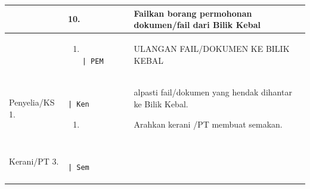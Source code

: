 \documentclass[
]{article}
\begin{document}
\begin{longtable}[]{@{}lll@{}}
\toprule
\begin{minipage}[b]{0.30\columnwidth}\raggedright
\strut
\end{minipage} & \begin{minipage}[b]{0.30\columnwidth}\raggedright
10.\strut
\end{minipage} & \begin{minipage}[b]{0.30\columnwidth}\raggedright
Failkan borang permohonan dokumen/fail dari Bilik Kebal\strut
\end{minipage}\tabularnewline
\midrule
\endhead
\begin{minipage}[t]{0.30\columnwidth}\raggedright
\strut
\end{minipage} & \begin{minipage}[t]{0.30\columnwidth}\raggedright
\begin{enumerate}
\def\labelenumi{\Alph{enumi}.}
\setcounter{enumi}{4}
\item
\begin{verbatim}
           | PEM
\end{verbatim}
\end{enumerate}\strut
\end{minipage} & \begin{minipage}[t]{0.30\columnwidth}\raggedright
ULANGAN FAIL/DOKUMEN KE BILIK KEBAL\strut
\end{minipage}\tabularnewline
\begin{minipage}[t]{0.30\columnwidth}\raggedright
Penyelia/KS \textbar{} 1.\strut
\end{minipage} & \begin{minipage}[t]{0.30\columnwidth}\raggedright
\begin{verbatim}
              | Ken
\end{verbatim}

\begin{enumerate}
\def\labelenumi{\arabic{enumi}.}
\setcounter{enumi}{1}
\item
\end{enumerate}\strut
\end{minipage} & \begin{minipage}[t]{0.30\columnwidth}\raggedright
alpasti fail/dokumen yang hendak dihantar ke Bilik Kebal.

Arahkan kerani /PT membuat semakan.\strut
\end{minipage}\tabularnewline
\begin{minipage}[t]{0.30\columnwidth}\raggedright
Kerani/PT \textbar{} 3.\strut
\end{minipage} & \begin{minipage}[t]{0.30\columnwidth}\raggedright
\begin{verbatim}
              | Sem
\end{verbatim}


\end{minipage}
\end{longtable}
\end{document}
